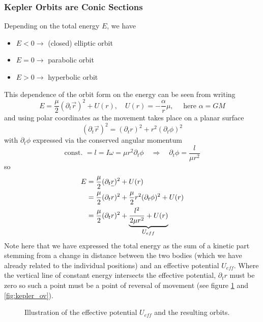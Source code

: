 \subsubsection{Kepler Orbits are Conic Sections}
Depending on the total energy $E$, we have
\begin{itemize}
  \item $E < 0 \rightarrow$ (closed) elliptic orbit
  \item $E = 0 \rightarrow$ parabolic orbit
  \item $E > 0 \rightarrow$ hyperbolic orbit
\end{itemize}
This dependence of the orbit form on the energy can be seen from writing
\begin{equation}
  E = \frac{\mu}{2}(\partial_t \vec{r})^2 + U(r), \quad U(r) = - \frac{\alpha}{r}\mu, \quad \text{ here } \alpha = GM
\end{equation}
and using polar coordinates as the movement takes place on a planar surface
\begin{equation}
  (\partial_t \vec{r})^2 = (\partial_t r)^2 + r^2 (\partial_t \phi)^2
\end{equation}
with $\partial_t \phi$ expressed via the conserved angular momentum
\begin{equation}
  \text{const. } = l = I \omega = \mu r^2 \partial_t \phi \quad \Rightarrow \quad \partial_t \phi = \frac{l}{\mu r^2}
\end{equation}
so
\begin{equation}
  \begin{aligned}
    E &= \frac{\mu}{2}(\partial_t \vec{r})^2 + U(r) \\
      &= \frac{\mu}{2}(\partial_t r)^2 + \frac{\mu}{2} r^2 (\partial_t \phi)^2 + U(r) \\
      &= \frac{\mu}{2}(\partial_t r)^2 + \explain{\frac{l^2}{2 \mu r^2} + U(r)}{$U_{eff}$}
  \end{aligned}
\end{equation}
Note here that we have expressed the total energy as the sum of a kinetic part stemming from a change in distance between the two bodies
(which we have already related to the individual positions) and an effective potential $U_{eff}$. Where the vertical line of constant
energy intersects the effective potential, $\partial_t r$ must be zero so such a point must be a point of reversal of movement (see figure \ref{fig:kepler_orbits} and \ref{fig:kepler_ov}).

\begin{figure}[!htb]
  \centering
  \hfill
  \caption{Illustration of the effective potential $U_{eff}$ and the resulting orbits.}
  \label{fig:kepler_orbits}
\end{figure}

